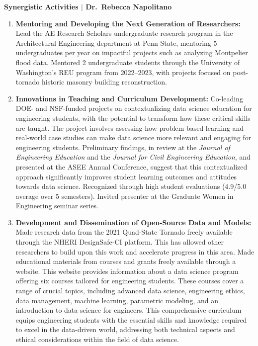\documentclass[11pt]{article}
\begin{document}
\pagestyle{empty}

\noindent \textbf{Synergistic Activities $|$ Dr.\ Rebecca Napolitano}

\vspace{0.3cm}

\begin{enumerate}[leftmargin=*, labelsep=0.5em, itemsep=0.4cm]

\item \textbf{Mentoring and Developing the Next Generation of Researchers:}
Lead the AE Research Scholars undergraduate research program in the
Architectural Engineering department at Penn State, mentoring 5 undergraduates
per year on impactful projects such as analyzing Montpelier flood data.
Mentored 2 undergraduate students through the University of Washington's REU
program from 2022--2023, with projects focused on post-tornado historic masonry
building reconstruction.

\item \textbf{Innovations in Teaching and Curriculum Development:}
Co-leading DOE- and NSF-funded projects on contextualizing data science
education for engineering students, with the potential to transform how these
critical skills are taught. The project involves assessing how problem-based
learning and real-world case studies can make data science more relevant and
engaging for engineering students. Preliminary findings, in review at the
\textit{Journal of Engineering Education} and the \textit{Journal for Civil
Engineering Education}, and presented at the ASEE Annual Conference, suggest
that this contextualized approach significantly improves student learning
outcomes and attitudes towards data science. Recognized through high student
evaluations (4.9/5.0 average over 5 semesters). Invited presenter at the
Graduate Women in Engineering seminar series.

\item \textbf{Development and Dissemination of Open-Source Data and Models:}
Made research data from the 2021 Quad-State Tornado freely available through
the NHERI DesignSafe-CI platform. This has allowed other researchers to build
upon this work and accelerate progress in this area. Made educational materials
from courses and grants freely available through a website. This website
provides information about a data science program offering six courses tailored
for engineering students. These courses cover a range of crucial topics,
including advanced data science, engineering ethics, data management, machine
learning, parametric modeling, and an introduction to data science for
engineers. This comprehensive curriculum equips engineering students with the
essential skills and knowledge required to excel in the data-driven world,
addressing both technical aspects and ethical considerations within the field
of data science.


\end{enumerate}
\end{document}
